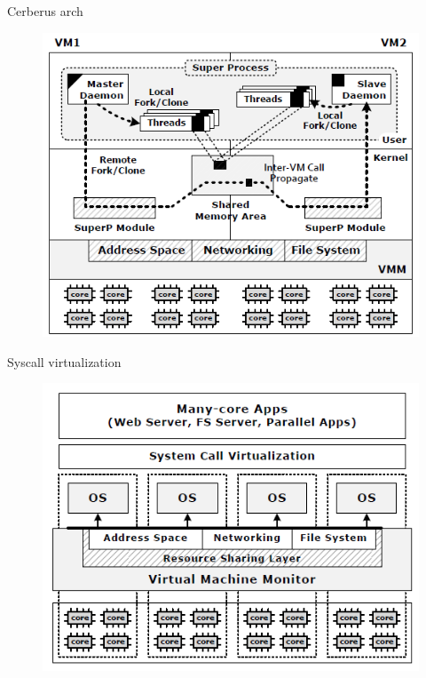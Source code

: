 \documentclass{beamer}
\begin{document}
	\begin{frame}{Cerberus arch}

		\begin{figure} [H]
			\centering
			\includegraphics[scale=0.40]{img/cerberus-architecture}
		\end{figure}	

	\end{frame}

	\begin{frame}{Syscall virtualization}
	
		\begin{figure} [H]
			\centering
			\includegraphics[scale=0.40]{img/syscall-virtualization}
		\end{figure}	

	\end{frame}
	
\end{document}
